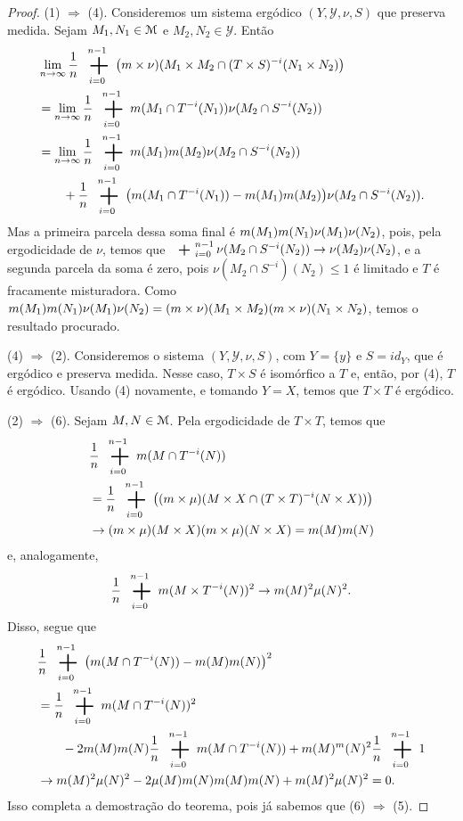 \begin{proof}
(1) $\Rightarrow$ (4). Consideremos um sistema ergódico $(Y,\mathcal Y,\nu,S)$ que preserva medida. Sejam $M_1,N_1 \in \mathcal{M}$ e $M_2,N_2 \in \mathcal Y$. Então
	\begin{align*}
	&\lim_{n\to\infty} \frac{1}{n} \sum_{i=0}^{n-1} \big(\med\times\nu)(M_1 \times M_2 \cap (T \times S)^{-i}(N_1 \times N_2)\big) \\
	&=\lim_{n\to \infty} \frac{1}{n} \sum_{i=0}^{n-1} \med(M_1 \cap T^{-i}(N_1))\nu(M_2 \cap S^{-i}(N_2)) \\
	&= \lim_{n\to\infty} \frac{1}{n} \sum_{i=0}^{n-1} \med(M_1)\med(M_2)\nu(M_2 \cap S^{-i}(N_2)) \\
	&\qquad + \frac{1}{n} \sum_{i=0}^{n-1}\big(\med(M_1 \cap T^{-i}(N_1))- \med(M_1)\med(M_2)\big)\nu(M_2 \cap S^{-i}(N_2)).
	\end{align*}
Mas a primeira parcela dessa soma final é $m(M_1)m(N_1)\nu(M_1)\nu(N_2)$, pois, pela ergodicidade de $\nu$, temos que  $\sum_{i=0}^{n-1}\nu(M_2 \cap S^{-i}(N_2)) \conv \nu(M_2)\nu(N_2)$, e a segunda parcela da soma é zero, pois $\nu(M_2 \cap S^{-i})(N_2) \leq 1$ é limitado e $T$ é fracamente misturadora. Como $m(M_1)m(N_1)\nu(M_1)\nu(N_2)=(m\times\nu)(M_1\times M_2)(m\times\nu)(N_1\times N_2)$, temos o resultado procurado.

(4) $\Rightarrow$ (2). Consideremos o sistema $(Y,\mathcal Y,\nu,S)$, com $Y=\{y\}$  e $S=id_Y$, que é ergódico e preserva medida. Nesse caso, $T\times S$ é isomórfico a $T$ e, então, por (4), $T$ é ergódico. Usando (4) novamente, e tomando $Y=X$, temos que $T \times T$ é ergódico.

(2) $\Rightarrow$ (6). Sejam $M,N \in \mathcal{M}$. Pela ergodicidade de $T \times T$, temos que
	\begin{align*}
	&\frac{1}{n} \sum_{i=0}^{n-1} \med(M \cap T^{-i}(N))\\
	&=\frac{1}{n} \sum_{i=0}^{n-1} \big( (\med\times\mu)(M \times X \cap (T \times T)^{-i}(N \times X))\big) \\
	& \conv (\med\times\mu)(M\times X)(\med\times\mu)(N\times X)=\med(M)\med(N)
	\end{align*}
e, analogamente,
	\begin{equation*}
	\frac{1}{n} \sum_{i=0}^{n-1} \med(M \times T^{-i}(N))^2 \conv \med(M)^2\mu(N)^2.
	\end{equation*}
Disso, segue que
	\begin{align*}
	&\frac{1}{n} \sum_{i=0}^{n-1} \big(\med(M \cap T^{-i}(N)) - \med(M)\med(N) \big)^2 \\
	&=\frac{1}{n} \sum_{i=0}^{n-1}\med(M \cap T^{-i}(N))^2 \\
		&\qquad - 2 \med(M)\med(N) \frac{1}{n} \sum_{i=0}^{n-1} \med(M \cap T^{-i}(N)) + \med(M)^\med(N)^2\frac{1}{n} \sum_{i=0}^{n-1} 1 \\
	&\conv \med(M)^2\mu(N)^2 - 2\mu(M)\med(N)\med(M)\med(N) + \med(M)^2\mu(N)^2 =0.
	\end{align*}
Isso completa a demostração do teorema, pois já sabemos que (6) $\Rightarrow$ (5).
\end{proof}

